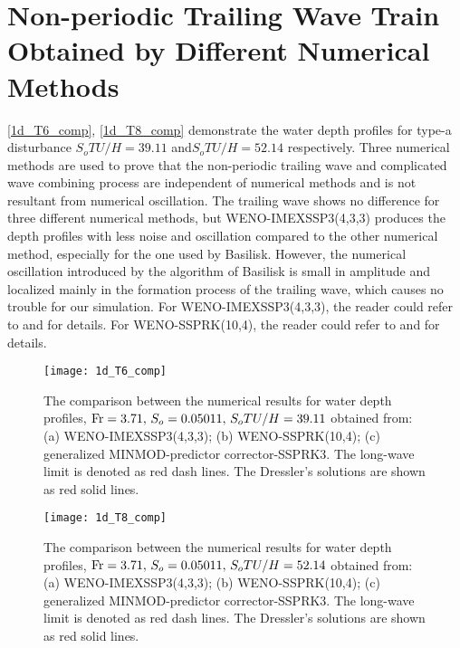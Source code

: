 \documentclass{jfm}
\newcommand{\fr}{{\rm{Fr}}}
\begin{document}
\appendix
\section{Non-periodic Trailing Wave Train Obtained by Different Numerical Methods}\label{appA}
\autoref{1d_T6_comp}, \autoref{1d_T8_comp} demonstrate the water depth profiles for type-a disturbance  $S_oTU/H=39.11$ and$S_oTU/H=52.14$  respectively. Three numerical methods are used to prove that the non-periodic trailing wave and complicated wave combining process are independent of numerical methods and is not resultant from numerical oscillation. The trailing wave shows no difference for three different numerical methods, but WENO-IMEXSSP3(4,3,3) produces the depth profiles with less noise and oscillation compared to the other numerical method, especially for the one used by Basilisk. However, the numerical oscillation introduced by the algorithm of Basilisk is small in amplitude and localized mainly in the formation process of the trailing wave, which causes no trouble for our simulation. For  WENO-IMEXSSP3(4,3,3), the reader could refer to \cite{Yu2021} and  \cite{Pareschi2005} for details. For  WENO-SSPRK(10,4), the reader could refer to \cite{KetParLev13} and  \cite{Ketcheson2008} for details.
 
\begin{figure}
	\centerline{\texttt{[image: 1d\_T6\_comp]}}
	\caption{The comparison between the numerical results for water depth profiles, $\fr=3.71,\,S_o=0.05011,\,S_oTU/H=39.11$ obtained from: (a) WENO-IMEXSSP3(4,3,3); (b) WENO-SSPRK(10,4); (c) generalized MINMOD-predictor corrector-SSPRK3. The long-wave limit is denoted as red dash lines. The Dressler's solutions are shown as red solid lines.} 
	\label{1d_T6_comp}
\end{figure}

\begin{figure}
	\centerline{\texttt{[image: 1d\_T8\_comp]}}
	\caption{The comparison between the numerical results for water depth profiles, $\fr=3.71,\,S_o=0.05011,\,S_oTU/H=52.14$ obtained from: (a) WENO-IMEXSSP3(4,3,3); (b) WENO-SSPRK(10,4); (c) generalized MINMOD-predictor corrector-SSPRK3. The long-wave limit is denoted as red dash lines. The Dressler's solutions are shown as red solid lines.} 
	\label{1d_T8_comp}
\end{figure}
\end{document}
